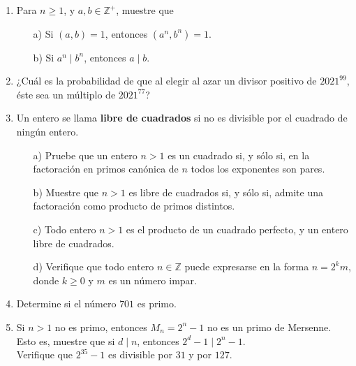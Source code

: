 \documentclass{article}
\newcommand{\ZZ}{\mathbb{Z}}
\begin{document}
\begin{sf}
\begin{enumerate}
\bigskip


\item
Para $n \geq 1$, y $a,b \in \ZZ^+$, muestre que
\begin{itemize}
	\item[a)] Si $(a, b) = 1$, entonces $(a^n, b^n) = 1$.
	\item[b)] Si $a^n \mid b^n$, entonces $a \mid b$.
\end{itemize}

\bigskip


\item
¿Cuál es la probabilidad de que al elegir al azar un divisor positivo de $2021^{99}$, éste sea un múltiplo de $2021^{77}$?

\bigskip


\item
Un entero se llama \textbf{libre de cuadrados} si no es divisible por el cuadrado de ningún entero. 
\begin{itemize}
	\item[a)] Pruebe que un entero $n > 1$ es un cuadrado si, y sólo si, en la factoración en primos canónica de $n$ todos los exponentes son pares.
	\item[b)] Muestre que $n > 1$ es libre de cuadrados si, y sólo si, admite una factoración como producto de primos distintos.
	\item[c)] Todo entero $n > 1$ es el producto de un cuadrado perfecto, y un entero libre de cuadrados.
	\item[d)] Verifique que todo entero $n \in \ZZ$ puede expresarse en la forma $n = 2^k m$, donde $k \geq 0$ y $m$ es un número impar.
\end{itemize}

\bigskip


\item
Determine si el número $701$ es primo.

\bigskip


\item
Si $n > 1$ no es primo, entonces $M_n = 2^n - 1$ no es un primo de Mersenne. Esto es, muestre que si $d \mid n$, entonces $2^d - 1 \mid 2^n -1$. \\
Verifique que $2^{35} - 1$ es divisible por $31$ y por $127$.


\end{enumerate}

\underline{\hspace{15cm}}

\bigskip
\noindent 

\end{sf}
\end{document}
